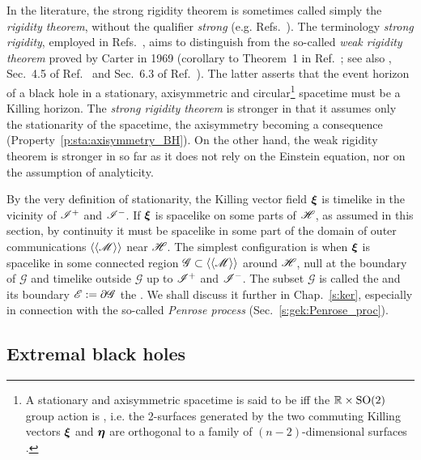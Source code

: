 In the literature, the strong rigidity theorem is sometimes called
simply the \emph{rigidity theorem}, without the qualifier \emph{strong}
(e.g. Refs.~\cite{Choqu09,HollaI12}).
The terminology \emph{strong rigidity}, employed in Refs.~\cite{Carte99,ChrusLH12,Heusl96},
aims to distinguish from the so-called
\emph{weak rigidity theorem}
proved by Carter in 1969 (corollary to Theorem~1 in Ref.~\cite{Carte69}; see also \cite{Carte72}, Sec.~4.5 of Ref.~\cite{Carte87} and Sec.~6.3 of Ref.~\cite{Heusl96}). The latter asserts that the event horizon of a black hole in a stationary, axisymmetric
and circular\footnote{A stationary and axisymmetric spacetime is said to be  iff the $\mathbb{R}\times\mathrm{SO}(2)$ group action
is , i.e. the 2-surfaces generated by the two commuting
Killing vectors $\bm{\xi}$ and $\bm{\eta}$ are orthogonal to a family of $(n-2)$-dimensional surfaces \cite{Carte69}.}
spacetime must be a Killing horizon. The \emph{strong rigidity theorem} is
stronger in that it assumes only the stationarity of the spacetime, the axisymmetry
becoming a consequence (Property~\ref{p:sta:axisymmetry_BH}). On the other hand,
the weak rigidity theorem is stronger in so far as it does not rely on
the Einstein equation, nor on the assumption of analyticity.

By the very definition of stationarity, the Killing vector field $\bm{\xi}$ is
timelike in the vicinity of $\mathscr{I}^+$ and $\mathscr{I}^-$. If $\bm{\xi}$ is spacelike
on some parts of $\mathscr{H}$, as assumed in this section, by continuity it must be spacelike
in some part of the domain of outer communications $\langle\langle \mathscr{M}\rangle\rangle$
near $\mathscr{H}$. The simplest configuration is when
$\bm{\xi}$ is spacelike in some connected region $\mathscr{G}\subset \langle\langle \mathscr{M}\rangle\rangle$
around $\mathscr{H}$, null at the boundary of $\mathscr{G}$ and timelike outside $\mathscr{G}$
up to $\mathscr{I}^+$ and $\mathscr{I}^-$. The subset $\mathscr{G}$ is
called the  and its boundary $\mathscr{E}:=\partial\mathscr{G}$
the . We shall discuss it further in Chap.~\ref{s:ker},
especially in connection with the so-called \emph{Penrose process}
(Sec.~\ref{s:gek:Penrose_proc}).

\subsection{Extremal black holes} \label{s:sta:extremal_BH}

